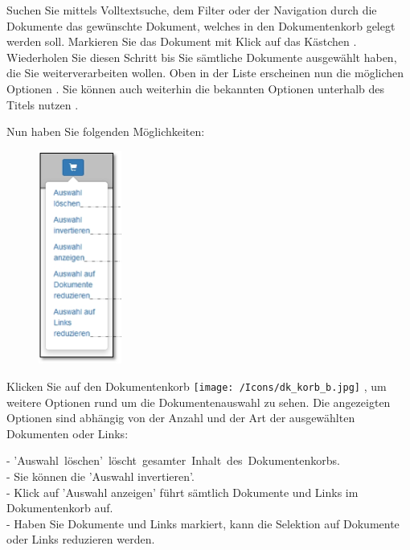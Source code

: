 Suchen Sie mittels Volltextsuche, dem Filter oder der Navigation durch die Dokumente das gewünschte Dokument, welches in den Dokumentenkorb gelegt werden soll. Markieren Sie das Dokument mit Klick auf das Kästchen . Wiederholen Sie diesen Schritt bis Sie sämtliche Dokumente ausgewählt haben, die Sie weiterverarbeiten wollen. Oben in der Liste erscheinen nun die möglichen Optionen . Sie können auch weiterhin die bekannten Optionen unterhalb des Titels nutzen .

\vspace{\baselineskip}

Nun haben Sie folgenden Möglichkeiten:\\


\begin{figure}
\vspace{-15pt}
\includegraphics[height=70mm]{../chapters/11_Dokumentenablage/pictures/11-dkorb_Auswahl.jpg}
\end{figure}
Klicken Sie auf den Dokumentenkorb \texttt{[image: /Icons/dk\_korb\_b.jpg]} , um weitere Optionen rund um die Dokumentenauswahl zu sehen. Die angezeigten Optionen sind abhängig von der Anzahl und der Art der ausgewählten Dokumenten oder Links:

- \mbox{'Auswahl löschen' löscht gesamter Inhalt des Dokumentenkorbs.}\\
- Sie können die 'Auswahl invertieren'.\\
- Klick auf 'Auswahl anzeigen' führt sämtlich Dokumente und Links im Dokumentenkorb auf.\\
- Haben Sie Dokumente und Links markiert, kann die Selektion auf Dokumente oder Links reduzieren werden.\\

